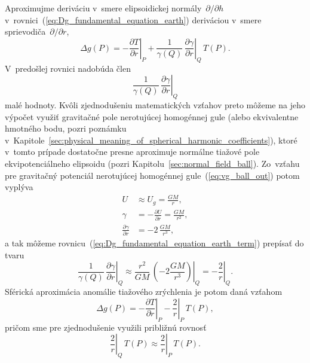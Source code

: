\documentclass[a4paper, 12pt]{book}
\begin{document}
Aproximujme deriváciu v~smere elipsoidickej normály~$\partial \slash \partial 
h$ v~rovnici~(\ref{eq:Dg_fundamental_equation_earth}) deriváciou v~smere 
sprievodiča~$\partial \slash \partial r$,
%
\begin{equation}
\Delta g(P) = -\left.\frac{\partial T}{\partial r}\right|_{P} 
+ \frac{1}{\gamma(Q)} \, \left.\frac{\partial \gamma}{\partial r}\right|_{Q} \, 
T(P){.}
\end{equation}
%
V~predošlej rovnici nadobúda člen
%
\begin{equation}
\label{eq:Dg_fundamental_equation_earth_term}
\left.\frac{1}{\gamma(Q)} \, \frac{\partial \gamma}{\partial r}\right|_Q
\end{equation}
%
malé hodnoty.  Kvôli zjednodušeniu matematických vzťahov preto môžeme na jeho 
výpočet využiť gravitačné pole nerotujúcej homogénnej gule (alebo ekvivalentne 
hmotného bodu, pozri poznámku 
v~Kapitole~\ref{sec:physical_meaning_of_spherical_harmonic_coefficients}), 
ktoré v~tomto prípade dostatočne presne aproximuje normálne tiažové pole 
ekvipotenciálneho elipsoidu (pozri Kapitolu~\ref{sec:normal_field_ball}).  
Zo~vzťahu pre gravitačný potenciál nerotujúcej homogénnej 
gule~(\ref{eq:vg_ball_out}) potom vyplýva
%
\begin{align}
U &\approx U_g = \frac{GM}{r}{,}\\
%
\gamma &= -\frac{\partial U}{\partial r} = \frac{GM}{r^2}{,}\\
%
\frac{\partial \gamma}{\partial r} &= -2 \, \frac{GM}{r^3}{,}
\end{align}
%
a tak môžeme rovnicu~(\ref{eq:Dg_fundamental_equation_earth_term}) prepísať do 
tvaru
%
\begin{equation}
\left.\frac{1}{\gamma(Q)} \, \frac{\partial \gamma}{\partial r}\right|_Q 
\approx \left.\frac{r^2}{GM} \, \left( -2\frac{GM}{r^3} \right)\right|_Q 
= -\left.\frac{2}{r}\right|_Q {.}
\end{equation}
%
Sférická aproximácia anomálie tiažového zrýchlenia je potom daná vzťahom
%
\begin{equation}
\label{eq:Dg_fundamental_equation_earth_sph}
\Delta g(P) = -\left.\frac{\partial T}{\partial r}\right|_{P} 
- \left.\frac{2}{r}\right|_{P} \, T(P){,}
\end{equation}
%
pričom sme pre zjednodušenie využili približnú rovnosť
%
\begin{equation}
\left.\frac{2}{r}\right|_Q \, T(P) \approx \left.\frac{2}{r}\right|_P \, 
T(P){.}
\end{equation}
\end{document}
